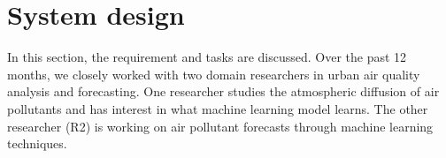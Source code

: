 \section{System design}
In this section, the requirement and tasks are discussed. Over the past 12 months, we closely worked with two domain researchers in urban air quality analysis and forecasting. 
One researcher  studies the atmospheric diffusion of air pollutants and has interest in what machine learning model learns.
The other researcher (R2) is working on air pollutant forecasts through machine learning techniques. 


